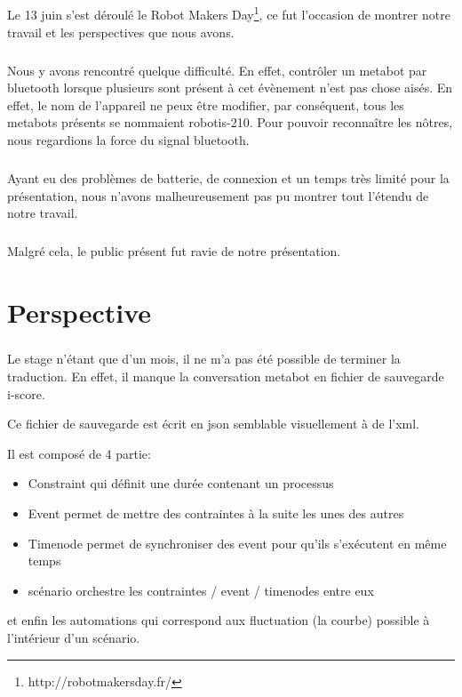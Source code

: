 \documentclass[10pt,a4paper]{report}
\begin{document}
\paragraph{}
Le 13 juin s'est déroulé le Robot Makers Day\footnote{http://robotmakersday.fr/}, ce fut l'occasion de montrer notre travail et les perspectives que nous avons.
\paragraph{}
Nous y avons rencontré quelque difficulté. En effet, contrôler un metabot par bluetooth lorsque plusieurs sont présent à cet évènement n'est pas chose aisés. En effet, le nom de l'appareil ne peux être modifier, par conséquent, tous les metabots présents se nommaient robotis-210. Pour pouvoir reconnaître les nôtres, nous regardions la force du signal bluetooth.
\paragraph{}
Ayant eu des problèmes de batterie, de connexion et un temps très limité pour la présentation, nous n'avons malheureusement pas pu montrer tout l'étendu de notre travail.
\paragraph{}
Malgré cela, le public présent fut ravie de notre présentation.

\paragraph{}
\chapter{Perspective}
\paragraph{}
Le stage n'étant que d'un mois, il ne m'a pas été possible de terminer la traduction. En effet, il manque la conversation metabot en fichier de sauvegarde i-score.

Ce fichier de sauvegarde est écrit en \acrfull{json} semblable visuellement à de l'xml.

Il est composé de 4 partie:
\begin{itemize}
\item Constraint qui définit une durée contenant un processus
\item Event permet de mettre des contraintes à la suite les unes des autres
\item Timenode permet de synchroniser des event pour qu'ils s'exécutent en même temps
\item scénario orchestre les contraintes / event / timenodes entre eux
\end{itemize}
et enfin les automations qui correspond aux fluctuation (la courbe) possible à l'intérieur d'un scénario.
\end{document}
